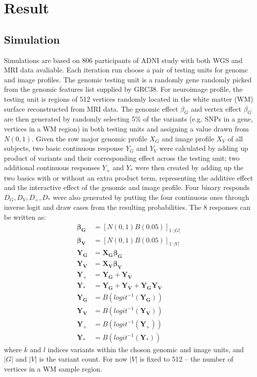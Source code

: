 \section{Result}
\subsection{Simulation}
Simulations are based on 806 participants of ADNI study with both WGS and MRI data avaliable. Each iteration run choose a pair of testing units for genomc and image profiles. The genomic testing unit is a randomly gene randomly picked from the genomic features list supplied by GRC38. For neuroimage profile, the testing unit is regions of 512 vertices randomly located in the white matter (WM) surface reconstructed from MRI data. The genomic effect $\beta_G$ and vertex effect $\beta_G$ are then generated by randomly selecting 5\% of the variants (e.g. SNPs in a gene, vertices in a WM region) in both testing units and assigning a value drawn from $N(0,1)$. Given the row major genomic profile $X_G$ and image profile $X_V$ of all subjects, two basic continuous response $Y_G$ and $Y_V$ were calculated by adding up product of variants and their corresponding effect across the testing unit; two additional continuous responses $Y_+$ and $Y_*$ were then created by adding up the two basics with or without an extra product term, representing the additive effect and the interactive effect of the genomic and image profile. Four binary responds $D_G, D_V, D_+, D_*$ were also generated by putting the four continuous ones through inverse logit and draw cases from the resulting probabilities. The 8 responses can be written as:
\begin{equation*} \label{eq:SIM}
\begin{split}
  \boldsymbol{\beta_G} &= [N(0,1) B(0.05)]_{1:|G|} \\
  \boldsymbol{\beta_V} &= [N(0,1) B(0.05)]_{1:|V|} \\
  \boldsymbol{Y_G}     &= \boldsymbol{X_G \beta_G} \\
  \boldsymbol{Y_V}     &= \boldsymbol{X_V \beta_V} \\
  \boldsymbol{Y_+}     &= \boldsymbol{Y_G} + \boldsymbol{Y_V} \\
  \boldsymbol{Y_*}     &= \boldsymbol{Y_G} + \boldsymbol{Y_V} + \boldsymbol{Y_G Y_V} \\
  \boldsymbol{Y_G}     &= B(logit^{-1}(\boldsymbol{Y_G})) \\
  \boldsymbol{Y_V}     &= B(logit^{-1}(\boldsymbol{Y_V})) \\
  \boldsymbol{Y_+}     &= B(logit^{-1}(\boldsymbol{Y_+})) \\
  \boldsymbol{Y_*}     &= B(logit^{-1}(\boldsymbol{Y_*}))
\end{split}
\end{equation*}
where $k$ and $l$ indices variants within the choson genomic and image units, and $|G|$ and $|V|$ is the variant count. For now $|V|$ is fixed to 512 -- the number of vertices in a WM sample region.

